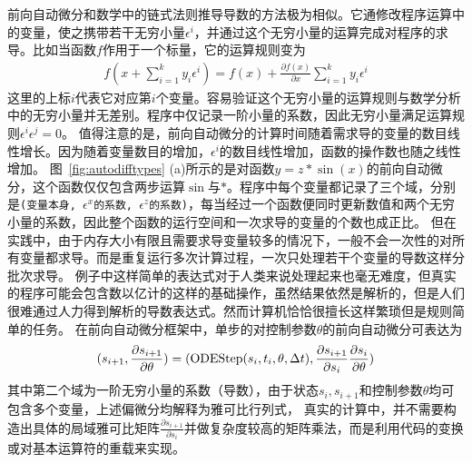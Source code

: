 \documentclass[A4,twoside,fontset=ubuntu,UTF8]{ctexart}
\begin{document}
前向自动微分和数学中的链式法则推导导数的方法极为相似。它通修改程序运算中的变量，使之携带若干无穷小量$\epsilon^i$，并通过这个无穷小量的运算完成对程序的求导。比如当函数$f$作用于一个标量，它的运算规则变为
\begin{align}
    f(x+\sum\limits^k_{i=1} y_i \epsilon^i) = f(x) + \frac{\partial f(x)}{\partial x} \sum\limits^k_{i=1}y_i\epsilon^i
\end{align}
这里的上标$i$代表它对应第$i$个变量。容易验证这个无穷小量的运算规则与数学分析中的无穷小量并无差别。程序中仅记录一阶小量的系数，因此无穷小量满足运算规则$\epsilon^i\epsilon^j = 0$。
值得注意的是，前向自动微分的计算时间随着需求导的变量的数目线性增长。因为随着变量数目的增加，$\epsilon^i$的数目线性增加，函数的操作数也随之线性增加。
图~\ref{fig:autodifftypes} (a)所示的是对函数$y=z *\sin(x)$的前向自动微分，这个函数仅仅包含两步运算$\sin$与$*$。程序中每个变量都记录了三个域，分别是\texttt{(变量本身, $\epsilon^x$的系数, $\epsilon^z$的系数)}，每当经过一个函数便同时更新数值和两个无穷小量的系数，因此整个函数的运行空间和一次求导的变量的个数也成正比。
但在实践中，由于内存大小有限且需要求导变量较多的情况下，一般不会一次性的对所有变量都求导。而是重复运行多次计算过程，一次只处理若干个变量的导数这样分批次求导。
例子中这样简单的表达式对于人类来说处理起来也毫无难度，但真实的程序可能会包含数以亿计的这样的基础操作，虽然结果依然是解析的，但是人们很难通过人力得到解析的导数表达式。然而计算机恰恰很擅长这样繁琐但是规则简单的任务。
在前向自动微分框架中，单步的对控制参数$\theta$的前向自动微分可表达为
$$(s_{i+1}, \frac{\partial s_{i+1}}{\partial \theta}) = ({\rm ODEStep}(s_{i}, t_i, \theta, \Delta t), \frac{\partial s_{i+1}}{\partial s_i} \frac{\partial s_{i}}{\partial \theta})$$
其中第二个域为一阶无穷小量的系数（导数），由于状态$s_i, s_{i+1}$和控制参数$\theta$均可包含多个变量，上述偏微分均解释为雅可比行列式，
真实的计算中，并不需要构造出具体的局域雅可比矩阵$\frac{\partial s_{i+1}}{\partial s_i}$并做复杂度较高的矩阵乘法，而是利用代码的变换或对基本运算符的重载来实现。
\end{document}
